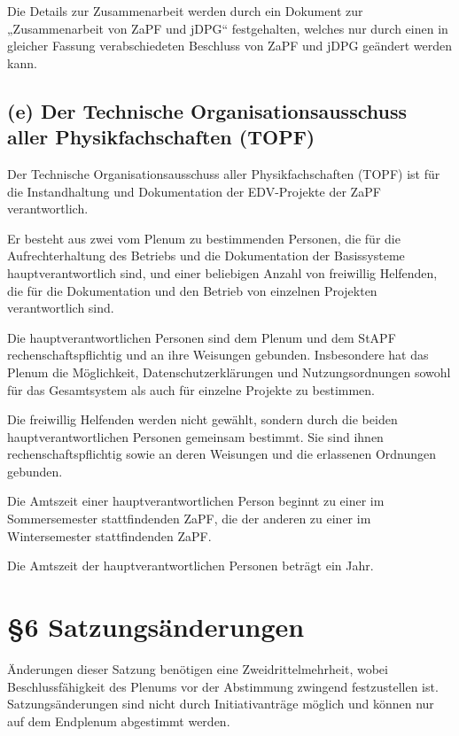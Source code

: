 \documentclass[12pt,oneside]{scrartcl}
\begin{document}
Die Details zur Zusammenarbeit werden durch ein Dokument zur „Zusammenarbeit von
ZaPF und jDPG“ festgehalten, welches nur durch einen in gleicher Fassung
verabschiedeten Beschluss von ZaPF und jDPG geändert werden kann.


\subsection{(e) Der Technische Organisationsausschuss aller Physikfachschaften (TOPF)%
  \label{e-der-technische-organisationsausschuss-aller-physikfachschaften-topf}%
}

Der Technische Organisationsausschuss aller Physikfachschaften (TOPF) ist für
die Instandhaltung und Dokumentation der EDV-Projekte der ZaPF verantwortlich.

Er besteht aus zwei vom Plenum zu bestimmenden Personen, die für die
Aufrechterhaltung des Betriebs und die Dokumentation der Basissysteme
hauptverantwortlich sind, und einer beliebigen Anzahl von freiwillig
Helfenden, die für die Dokumentation und den Betrieb von einzelnen Projekten
verantwortlich sind.

Die hauptverantwortlichen Personen sind dem Plenum und dem StAPF
rechenschaftspflichtig und an ihre Weisungen gebunden.
Insbesondere hat das Plenum die Möglichkeit, Datenschutzerklärungen und
Nutzungsordnungen sowohl für das Gesamtsystem als auch für einzelne Projekte zu
bestimmen.

Die freiwillig Helfenden werden nicht gewählt, sondern durch die beiden
hauptverantwortlichen Personen gemeinsam bestimmt.
Sie sind ihnen rechenschaftspflichtig sowie an deren Weisungen und die
erlassenen Ordnungen gebunden.

Die Amtszeit einer hauptverantwortlichen Person beginnt zu einer im
Sommersemester stattfindenden ZaPF, die der anderen zu einer im Wintersemester
stattfindenden ZaPF.

Die Amtszeit der hauptverantwortlichen Personen beträgt ein Jahr.


\section{§6 Satzungsänderungen%
  \label{satzungsanderungen}%
}

Änderungen dieser Satzung benötigen eine Zweidrittelmehrheit, wobei Beschlussfähigkeit
des Plenums vor der Abstimmung zwingend festzustellen ist.
Satzungsänderungen sind nicht durch Initiativanträge möglich und können nur auf
dem Endplenum abgestimmt werden.
\end{document}
